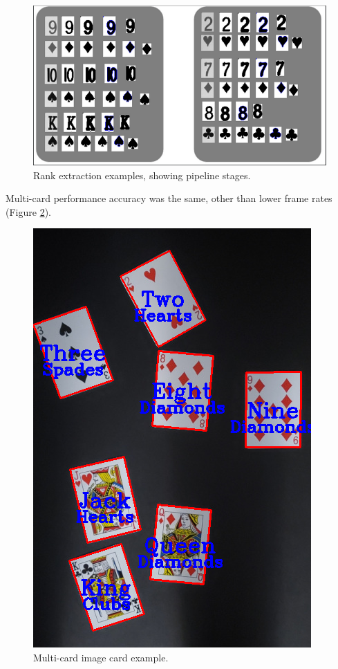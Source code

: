 \documentclass[conference]{IEEEtran}
\begin{document}
\begin{figure}[htbp]
\centerline{\includegraphics[width=\columnwidth]{rank-extraction.png}}
\caption{Rank extraction examples, showing pipeline stages.}
\label{fig:rank-extraction}
\end{figure}

 Multi-card performance accuracy was the same, other than lower frame rates (Figure \ref{fig:multi-card-image}).

\begin{figure}[htbp]
\centerline{\includegraphics[width=\columnwidth]{multi-card-image.png}}
\caption{Multi-card image card example.}
\label{fig:multi-card-image}
\end{figure}
\end{document}
